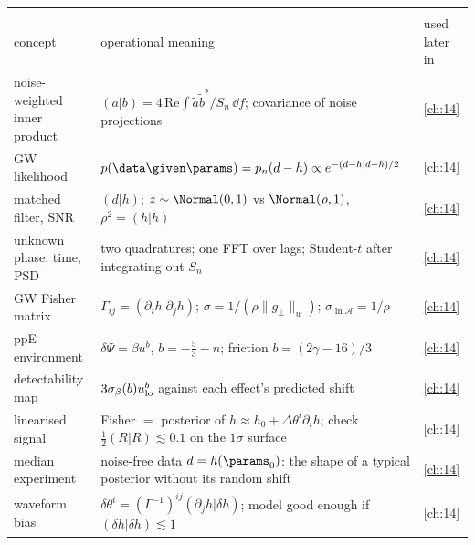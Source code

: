 \begin{center}
\small
\renewcommand{\arraystretch}{1.15}
\begin{tabularx}{\linewidth}{@{}>{\raggedright\arraybackslash}p{3.3cm}
                               >{\raggedright\arraybackslash}X
                               >{\raggedright\arraybackslash}p{2.3cm}@{}}
\toprule
\multicolumn{3}{@{}l}{\textbf{Gravitational waves}}\\
concept & operational meaning & used later in\\\midrule
noise-weighted inner product & $(a|b)=4\,\mathrm{Re}\int\tilde a\tilde b^*/S_n\,\dd f$; covariance of noise projections & \cref{ch:14}\\
GW likelihood & $p(\data\given\params)=p_n(d-h)\propto e^{-(d-h|d-h)/2}$ & \cref{ch:14}\\
matched filter, SNR & $(d|h)$; $z\sim\Normal(0,1)$ vs $\Normal(\rho,1)$, $\rho^2=(h|h)$ & \cref{ch:14}\\
unknown phase, time, PSD & two quadratures; one FFT over lags; Student-$t$ after integrating out $S_n$ & \cref{ch:14}\\
GW Fisher matrix & $\Gamma_{ij}=(\partial_ih|\partial_jh)$; $\sigma=1/(\rho\|g_\perp\|_w)$; $\sigma_{\ln\mathcal A}=1/\rho$ & \cref{ch:14}\\
ppE environment & $\delta\Psi=\beta u^b$, $b=-\frac53-n$; friction $b=(2\gamma-16)/3$ & \cref{ch:14}\\
detectability map & $3\sigma_\beta(b)u_{\rm lo}^b$ against each effect's predicted shift & \cref{ch:14}\\
linearised signal & Fisher $=$ posterior of $h\approx h_0+\Delta\theta^i\partial_ih$; check $\tfrac12(R|R)\lesssim0.1$ on the $1\sigma$ surface & \cref{ch:14}\\
median experiment & noise-free data $d=h(\params_0)$: the shape of a typical posterior without its random shift & \cref{ch:14}\\
waveform bias & $\delta\theta^i=(\Gamma^{-1})^{ij}(\partial_jh|\delta h)$; model good enough if $(\delta h|\delta h)\lesssim1$ & \cref{ch:14}\\
\bottomrule
\end{tabularx}
\end{center}

